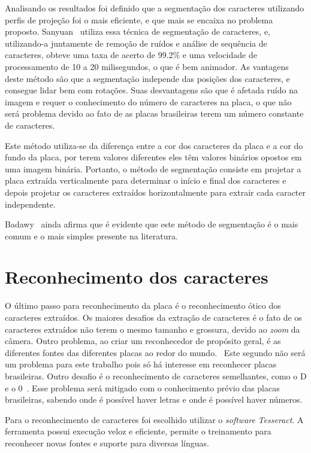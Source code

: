 Analisando os resultados foi definido que a segmentação dos caracteres
utilizando perfis de projeção foi o mais eficiente, e que mais se encaixa no
problema proposto. Sanyuan~\cite{sanyuan2004car} utiliza essa técnica de
segmentação de caracteres, e, utilizando-a juntamente de remoção de ruídos e
análise de sequência de caracteres, obteve uma taxa de acerto de 99.2\% e uma
velocidade de processamento de 10 a 20 milisegundos, o que é bem animador. As
vantagens deste método são que a segmentação independe das posições dos
caracteres, e consegue lidar bem com rotações. Suas desvantagens são que é
afetada ruído na imagem e requer o conhecimento do número de caracteres na
placa, o que não será problema devido ao fato de as placas brasileiras terem um
número constante de caracteres.

Este método utiliza-se da diferença entre a cor dos caracteres da placa e a cor
do fundo da placa, por terem valores diferentes eles têm valores binários
opostos em uma imagem binária. Portanto, o método de segmentação consiste em
projetar a placa extraída verticalmente para determinar o início e final dos
caracteres e depois projetar os caracteres extraídos horizontalmente para
extrair cada caracter independente.

Badawy~\cite{s2013automatic} ainda afirma que é evidente que este método de
segmentação é o mais comum e o mais simples presente na literatura.

\section{Reconhecimento dos caracteres} \label{sec:reconhecimento}

O último passo para reconhecimento da placa é o reconhecimento ótico dos
caracteres extraídos. Os maiores desafios da extração de caracteres é o fato de
os caracteres extraídos não terem o mesmo tamanho e grossura, devido ao
\emph{zoom} da câmera. Outro problema, ao criar um reconhecedor de propósito
geral, é as diferentes fontes das diferentes placas ao redor do mundo.~\cite{s2013automatic}
Este segundo não será um problema para este trabalho pois
só há interesse em reconhecer placas brasileiras. Outro desafio é o
reconhecimento de caracteres semelhantes, como o D e o
0~\cite{ho2016intelligent}.  Esse problema será mitigado com o conhecimento
prévio das placas brasileiras, sabendo onde é possível haver letras e onde é
possível haver números.

Para o reconhecimento de caracteres foi escolhido utilizar o \emph{software}
\emph{Tesseract}. A ferramenta possui execução veloz e eficiente, permite o
treinamento para reconhecer novas fontes e suporte para diversas línguas.
